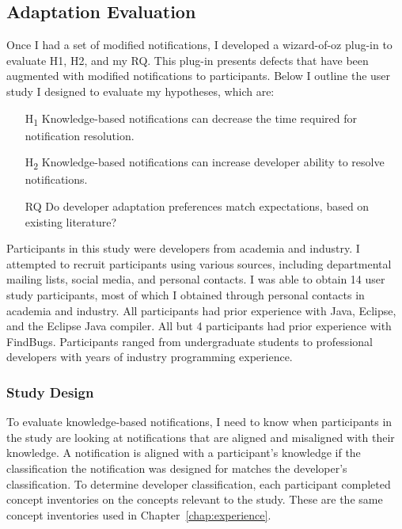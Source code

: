 \subsection{Adaptation Evaluation}

Once I had a set of modified notifications, I developed a wizard-of-oz plug-in to evaluate H1, H2, and my RQ. This plug-in presents defects that have been augmented with modified notifications to participants. Below I outline the user study I designed to evaluate my hypotheses, which are:

\begin{itemize}
    \item [H\textsubscript{1}] Knowledge-based notifications can decrease the time required for notification resolution.
    \item [H\textsubscript{2}] Knowledge-based notifications can increase developer ability to resolve notifications.
    \item[RQ] Do developer adaptation preferences match expectations, based on existing literature?
\end{itemize}


Participants in this study were developers from academia and industry. 
I attempted to recruit participants using various sources, including departmental mailing lists, social media, and personal contacts.
I was able to obtain 14 user study participants, most of which I obtained through personal contacts in academia and industry.
All participants had prior experience with Java, Eclipse, and the Eclipse Java compiler. All but 4 participants had prior experience with FindBugs. 
Participants ranged from undergraduate students to professional developers with years of industry programming experience.

\subsubsection{Study Design}

To evaluate knowledge-based notifications, I need to know when participants in  the study are looking at notifications that are aligned and misaligned with their knowledge. A notification is aligned with a participant's knowledge if the classification the notification was designed for matches the developer's classification. To determine developer classification, each participant completed concept inventories on the concepts relevant to the study. These are the same concept inventories used in Chapter~\ref{chap:experience}.

